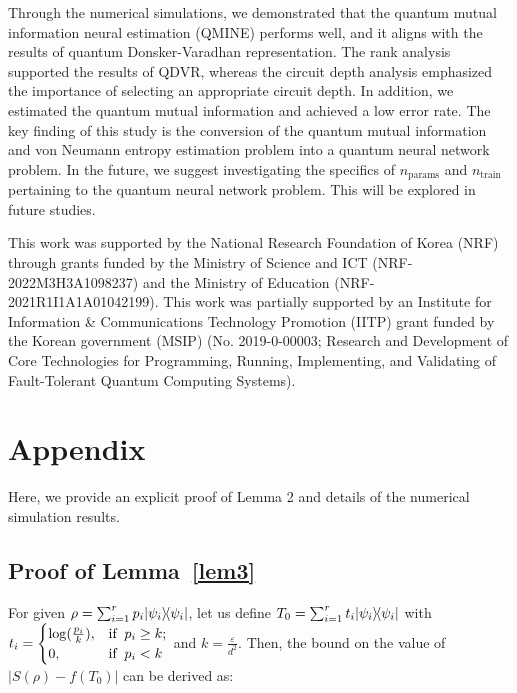 \documentclass[aps,groupedaddress,superscriptaddress,amssymb,amsmath,amsbsy,amsfonts,twocolumn,pra]{revtex4}
\begin{document}
Through the numerical simulations, we demonstrated that the quantum mutual information neural estimation (QMINE) performs well, and it aligns with the results of quantum Donsker-Varadhan representation. The rank analysis supported the results of QDVR, whereas the circuit depth analysis emphasized the importance of selecting an appropriate circuit depth. In addition, we estimated the quantum mutual information and achieved a low error rate. The key finding of this study is the conversion of the quantum mutual information and von Neumann entropy estimation problem into a quantum neural network problem. In the future, we suggest investigating the specifics of $n_\text{params}$ and $n_\text{train}$ pertaining to the quantum neural network problem. This will be explored in future studies.

\begin{acknowledgments}
This work was supported by the National Research Foundation of Korea (NRF) through grants funded by the Ministry of Science and ICT (NRF-2022M3H3A1098237) and the Ministry of Education (NRF-2021R1I1A1A01042199). This work was partially supported by an Institute for Information \& Communications Technology Promotion (IITP) grant funded by the Korean government (MSIP) (No. 2019-0-00003; Research and Development of Core Technologies for Programming, Running, Implementing, and Validating of Fault-Tolerant Quantum Computing Systems).
\end{acknowledgments}


\section{Appendix}
Here, we provide an explicit proof of Lemma 2 and details of the numerical simulation results. \\

\bigskip
\subsection{Proof of Lemma~\ref{lem3}} \label{app:a}
For given $\rho = \sum^r_{i=1} p_i | \psi_i \rangle\!\langle \psi_i |$, let us define $T_0 = \sum^r_{i=1} t_i| \psi_i \rangle\!\langle \psi_i |$ with $t_i = \begin{cases} \log(\frac{p_i}{k}), & {\textnormal{if}}\;\;p_i \geq k; \\ 0, & {\textnormal{if}}\;\;p_i < k \end{cases}$ and $k=\frac{\varepsilon}{d^2}$. Then, the bound on the value of $\left|S\left(\rho\right)-f\left(T_0\right)\right|$ can be derived as:
\end{document}

